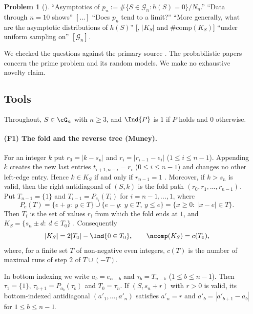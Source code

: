 \documentclass[11pt,a4paper]{article}
\theoremstyle{definition}
\newtheorem{problem}[theorem]{Problem}
\theoremstyle{remark}
\numberwithin{equation}{section}
\begin{document}
\begin{problem}[{\cite[Sect.~16, item (2)]{R003}}]\label{B:G:prob:pn}
``Asymptotics of $p_n:=\#\{S\in\mathcal{G}_n: h(S)=0\}/N_n$.'' ``Data through $n=10$
shows'' $[\dots]$ ``Does $p_n$ tend to a limit?'' ``More generally, what are the asymptotic
distributions of $h(S)$'' $[$, $|K_S|$ and $\#\mathrm{comp}(K_S)]$ ``under uniform sampling on''
$[\mathcal{G}_n]$.
\end{problem}

We checked the questions against the primary source \cite{R003}. The probabilistic papers \cite{R024,R004} concern the prime problem and its random models. We make no exhaustive novelty claim.

\subsection{Tools}\label{B:G:sub:tools}

Throughout, $S\in\cG_n$ with $n\ge3$, and $\Ind{P}$ is $1$ if $P$ holds and $0$ otherwise.

\paragraph{(F1) The fold and the reverse tree (Muney).}
For an integer $k$ put $r_0=|k-s_n|$ and $r_i=|r_{i-1}-e_i|$ ($1\le i\le n-1$). Appending $k$
creates the new last entries $t_{i+1,n-i}=r_i$ ($0\le i\le n-1$) and changes no other left-edge
entry. Hence $k\in K_S$ if and only if $r_{n-1}=1$ \cite[Prop.~2]{R003}. Moreover, if
$k>s_n$ is valid, then the right antidiagonal of $(S,k)$ is the fold path
$(r_0,r_1,\dots,r_{n-1})$. Put $T_{n-1}=\{1\}$ and
$T_{i-1}=P_{e_i}(T_i)$ for $i=n-1,\dots,1$, where
\[
 P_e(T)=\{e+y:\ y\in T\}\cup\{e-y:\ y\in T,\ y\le e\}=\{x\ge0:\ |x-e|\in T\}.
\]
Then $T_i$ is the set of values $r_i$ from which the fold ends at $1$, and
$K_S=\{s_n\pm d:\ d\in T_0\}$ \cite[Prop.~18]{R003}. Consequently
\begin{equation}\label{B:G:eq:Kc}
 |K_S|=2|T_0|-\Ind{0\in T_0},\qquad \ncomp(K_S)=c(T_0),
\end{equation}
where, for a finite set $T$ of non-negative even integers, $c(T)$ is the number of maximal runs of
step $2$ of $T\cup(-T)$.

In bottom indexing we write $a_b=e_{n-b}$ and $\tau_b=T_{n-b}$ ($1\le b\le n-1$). Then
$\tau_1=\{1\}$, $\tau_{b+1}=P_{a_b}(\tau_b)$ and $T_0=\tau_n$. If $(S,s_n+r)$ with $r>0$ is
valid, its bottom-indexed antidiagonal $(a'_1,\dots,a'_n)$ satisfies
$a'_n=r$ and $a'_b=|a'_{b+1}-a_b|$ for $1\le b\le n-1$.
\end{document}
